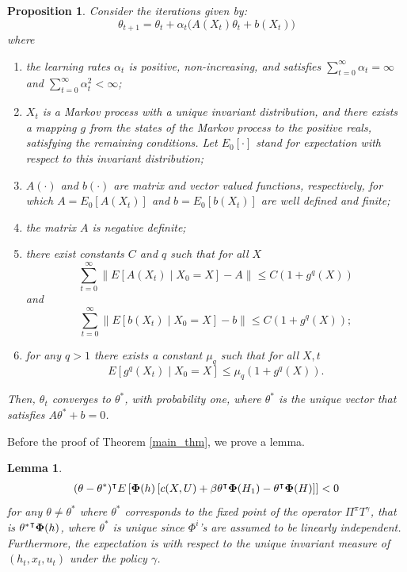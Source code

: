 \documentclass[letterpaper, 10 pt, conference]{ieeeconf}  %
\newtheorem{lemma}{Lemma}
\newtheorem{prop}{Proposition}
\theoremstyle{definition}
\theoremstyle{remark}
\begin{document}
\begin{prop}\label{vanroy_lem}
Consider the iterations given by:
\begin{equation*}
    \theta_{t+1} = \theta_t + \alpha_t \big( A(X_t) \theta_t + b(X_t) \big)
\end{equation*}
where
\begin{enumerate}
    \item the learning rates $\alpha_t$ is positive, non-increasing, and satisfies $\sum_{t=0}^{\infty} \alpha_t = \infty$ and $\sum_{t=0}^{\infty} \alpha_t^2 < \infty$;
    \item $X_t$ is a Markov process with a unique invariant distribution, and there exists a mapping $g$ from the states of the Markov process to the positive reals, satisfying the remaining conditions. Let ${E}_0[\cdot]$ stand for expectation with respect to this invariant distribution;
    \item $A(\cdot)$ and $b(\cdot)$ are matrix and vector valued functions, respectively, for which $A = {E}_0[A(X_t)]$ and $b = {E}_0[b(X_t)]$ are well defined and finite;
    \item the matrix $A$ is negative definite;
    \item there exist constants $C$ and $q$ such that for all $X$
    \begin{equation*}
        \sum_{t=0}^{\infty} \|E[A(X_t) \mid X_0 = X] - A\| \leq C(1 + g^q(X))
    \end{equation*}
    and
    \begin{equation*}
        \sum_{t=0}^{\infty} \|E[b(X_t) \mid X_0 = X] - b\| \leq C(1 + g^q(X));
    \end{equation*}
    \item for any $q > 1$ there exists a constant $\mu_q$ such that for all $X, t$
    \begin{equation*}
        E[g^q(X_t) \mid X_0 = X] \leq \mu_q (1 + g^q(X)).
    \end{equation*}
\end{enumerate}
Then, $\theta_t$ converges to $\theta^*$, with probability one, where $\theta^*$ is the unique vector that satisfies $A\theta^* + b = 0$.
\end{prop}
Before the proof of Theorem \ref{main_thm}, we prove a lemma.
\begin{lemma}\label{helpful_lem}
\begin{align*}
(\theta-\theta^*)^\intercal E\left[ {\bf \Phi}(h)\left[ c(X,U)+\beta \theta^\intercal{\bf \Phi}(H_1) - \theta^\intercal{\bf \Phi}(H)\right] \right]<0
\end{align*}
for any $\theta\neq\theta^*$ where $\theta^*$ corresponds to the fixed point of the operator $\Pi^\pi T^\gamma$, that is ${\theta^*}^\intercal{\bf \Phi}(h)$, where $\theta^*$ is unique since $\Phi^i$'s are assumed to be linearly independent. Furthermore, the expectation is with respect to the unique invariant measure of $(h_t,x_t,u_t)$ under the policy $\gamma$.
\end{lemma}
\end{document}
